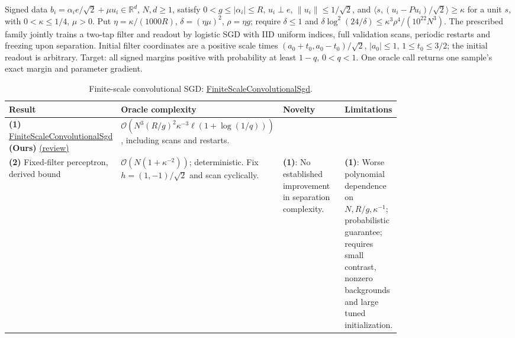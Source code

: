 \begin{table}[tp]
\centering
\caption{Finite-scale convolutional SGD: \href{https://github.com/k3nfalt/longtails/blob/main/LongTails/Setups/FiniteScaleConvolutionalSgd.lean}{FiniteScaleConvolutionalSgd}.}\label{tab:FiniteScaleConvolutionalSgd}
\parbox{\linewidth}{\footnotesize Signed data $b_i=\alpha_i e/\sqrt2+\mu u_i\in\mathbb R^d$, $N,d\ge1$, satisfy $0<g\le|\alpha_i|\le R$, $u_i\perp e$, $\|u_i\|\le1/\sqrt2$, and $\langle s,(u_i-Pu_i)/\sqrt2\rangle\ge\kappa$ for a unit $s$, with $0<\kappa\le1/4$, $\mu>0$. Put $\eta=\kappa/(1000R)$, $\delta=(\eta\mu)^2$, $\rho=\eta g$; require $\delta\le1$ and $\delta\log^2(24/\delta)\le\kappa^3\rho^4/(10^{22}N^3)$. The prescribed family jointly trains a two-tap filter and readout by logistic SGD with IID uniform indices, full validation scans, periodic restarts and freezing upon separation. Initial filter coordinates are a positive scale times $(a_0+t_0,a_0-t_0)/\sqrt2$, $|a_0|\le1$, $1\le t_0\le3/2$; the initial readout is arbitrary. Target: all signed margins positive with probability at least $1-q$, $0<q<1$. One oracle call returns one sample's exact margin and parameter gradient.}\par\smallskip
\begin{threeparttable}
\footnotesize
\setlength{\tabcolsep}{4pt}\renewcommand{\arraystretch}{1.25}
\begin{tabularx}{\linewidth}{@{}>{\raggedright\arraybackslash}p{0.20\linewidth}>{\raggedright\arraybackslash}p{0.32\linewidth}>{\raggedright\arraybackslash}p{0.25\linewidth}>{\raggedright\arraybackslash}X@{}}
\toprule
\textbf{Result} & \textbf{Oracle complexity} & \textbf{Novelty} & \textbf{Limitations} \\
\midrule
\textbf{(1)} \href{https://github.com/k3nfalt/longtails/blob/main/LongTails/Theorems/FiniteScaleConvolutionalSgd.lean}{Finite\allowbreak Scale\allowbreak Convolutional\allowbreak Sgd} \textbf{(Ours)} \href{https://github.com/k3nfalt/longtails/blob/main/scripts/reviews/FiniteScaleConvolutionalSgd.md}{(review)} & $\mathcal{O}\!\left(N^3(R/g)^2\kappa^{-3}\ell(1+\log(1/q))\right)$, including scans and restarts. & & \\
\midrule[1.2pt]
\textbf{(2)} Fixed-filter perceptron, derived bound \citep{fscNovikoff1963} & $\mathcal{O}\!\left(N(1+\kappa^{-2})\right)$; deterministic. Fix $h=(1,-1)/\sqrt2$ and scan cyclically. & \textbf{(1)}: No established improvement in separation complexity. & \textbf{(1)}: Worse polynomial dependence on $N,R/g,\kappa^{-1}$; probabilistic guarantee; requires small contrast, nonzero backgrounds and large tuned initialization. \\

\end{tabularx}
\end{threeparttable}
\end{table}
